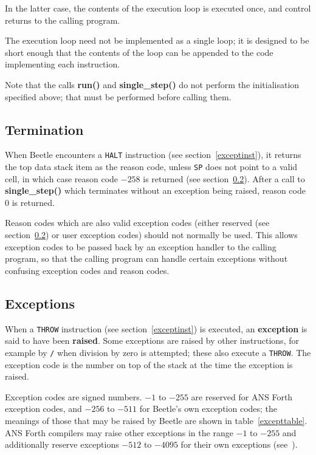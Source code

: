 \documentclass{article}
\begin{document}
In the latter case, the contents of the execution loop is executed once, and
control returns to the calling program.

The execution loop need not be implemented as a single loop; it  is designed to
be short enough that the contents of the loop can be appended  to the code
implementing each instruction.

Note that the calls {\bf run()} and {\bf single\_step()} do not perform the
initialisation specified above; that must be performed before calling them.


\subsection{Termination}

When Beetle encounters a {\tt HALT} instruction (see section~\ref{exceptinst}),
it returns the top data stack item as the reason code, unless {\tt SP} does not
point to a valid cell, in which case reason code $-258$ is returned (see section~\ref{exceptions}).
After a call to {\bf single\_step()} which terminates without
an exception being raised, reason code 0 is returned.

Reason codes which are also valid exception codes (either reserved (see section~\ref{exceptions})
or user exception codes) should not normally be used. This
allows exception codes to be passed back by an exception handler to the calling
program, so that the calling program can handle certain exceptions without
confusing exception codes and reason codes.


\subsection{Exceptions}
\label{exceptions}

When a {\tt THROW} instruction (see section~\ref{exceptinst}) is executed, an
{\bf exception} is said to have been {\bf raised}. Some exceptions are raised by
other instructions, for example by {\tt /} when division by zero is attempted;
these also execute a {\tt THROW}. The exception code is the number on top of the
stack at the time the exception is raised.

Exception codes are signed numbers. $-1$ to $-255$ are reserved for ANS Forth
exception codes, and $-256$ to $-511$ for Beetle's own exception codes; the meanings
of those that may be raised by Beetle are shown in table~\ref{excepttable}. ANS
Forth compilers may raise other exceptions in the range $-1$ to $-255$ and
additionally reserve exceptions $-512$ to $-4095$ for their own exceptions
(see~\cite[section 9.3.1]{ANSIforth}).
\end{document}
